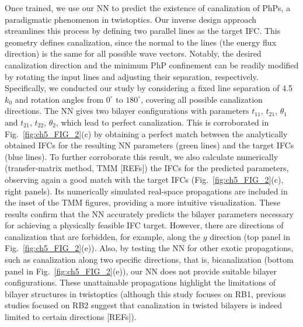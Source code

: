 Once trained, we use our NN to predict the existence of canalization of PhPs, a paradigmatic phenomenon in twistoptics. Our inverse design approach streamlines this process by defining two parallel lines as the target IFC. This geometry defines canalization, since the normal to the lines (the energy flux direction) is the same for all possible wave vectors. Notably, the desired canalization direction and the minimum PhP confinement can be readily modified by rotating the input lines and adjusting their separation, respectively. Specifically, we conducted our study by considering a fixed line separation of 4.5 $k_0$ and rotation angles from $0^\circ$ to $180^\circ$, covering all possible canalization directions. The NN gives two bilayer configurations with parameters $t_{11}$, $t_{21}$, $\theta_1$ and $t_{21}$, $t_{22}$, $\theta_2$, which lead to perfect canalization. This is corroborated in Fig.~\ref{fig:ch5_FIG_2}(c) by obtaining a perfect match between the analytically obtained IFCs for the resulting NN parameters (green lines) and the target IFCs (blue lines). To further corroborate this result, we also calculate numerically (transfer-matrix method, TMM [REFs]) the IFCs for the predicted parameters, observing again a good match with the target IFCs (Fig.~\ref{fig:ch5_FIG_2}(c), right panels). Its numerically simulated real-space propagations are included in the inset of the TMM figures, providing a more intuitive visualization. These results confirm that the NN accurately predicts the bilayer parameters necessary for achieving a physically feasible IFC target. However, there are directions of canalization that are forbidden, for example, along the $y$ direction (top panel in Fig.~\ref{fig:ch5_FIG_2}(e)). Also, by testing the NN for other exotic propagations, such as canalization along two specific directions, that is, bicanalization (bottom panel in Fig.~\ref{fig:ch5_FIG_2}(e)), our NN does not provide suitable bilayer configurations. These unattainable propagations highlight the limitations of bilayer structures in twistoptics (although this study focuses on RB1, previous studies focused on RB2 suggest that canalization in twisted bilayers is indeed limited to certain directions [REFs]).


